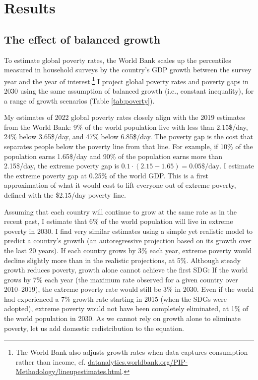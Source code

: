 \documentclass[12pt,english]{article}
\begin{document}
\section{Results}
\subsection{The effect of balanced growth}

To estimate global poverty rates, the World Bank scales up the percentiles measured in household surveys by the country's GDP growth between the survey year and the year of interest.\footnote{The World Bank also adjusts growth rates when data captures consumption rather than income, cf. \href{https://datanalytics.worldbank.org/PIP-Methodology/lineupestimates.html\#extrapolations}{datanalytics.worldbank.org/PIP-Methodology/lineupestimates.html}.} I project global poverty rates and poverty gaps in 2030 using the same assumption of balanced growth (i.e., constant inequality), for a range of growth scenarios (Table \ref{tab:poverty}). 



My estimates of 2022 global poverty rates closely align with the 2019 estimates from the World Bank: 9\% of the world population live with less than 2.15\$/day, 24\% below 3.65\$/day, and 47\% below 6.85\$/day. 
The poverty gap is the cost that separates people below the poverty line from that line. For example, if 10\% of the population earns 1.65\$/day and 90\% of the population earns more than 2.15\$/day, the extreme poverty gap is $0.1 \cdot (2.15 - 1.65) = 0.05\$/\text{day}$. %
I estimate the extreme poverty gap at 0.25\% of the world GDP. This is a first approximation of what it would cost to lift everyone out of extreme poverty, defined with the \$2.15/day poverty line. 

Assuming that each country will continue to grow at the same rate as in the recent past, %
I estimate that 6\% of the world population will live in extreme poverty in 2030. I find very similar estimates using a simple yet realistic model to predict a country's growth (an autoregressive projection based on its growth over the last 20 years). 
If each country grows by 3\% each year, extreme poverty would decline slightly more than in the realistic projections, at 5\%. 
Although steady growth reduces poverty, growth alone cannot achieve the first SDG: If the world grows by 7\% each year (the maximum rate observed for a given country over 2010--2019), %
the extreme poverty rate would still be 3\% in 2030. Even if the world had experienced a 7\% growth rate starting in 2015 (when the SDGs were adopted), extreme poverty would not have been completely eliminated, at 1\% of the world population in 2030. 
As we cannot rely on growth alone to eliminate poverty, let us add domestic redistribution to the equation.
\end{document}
